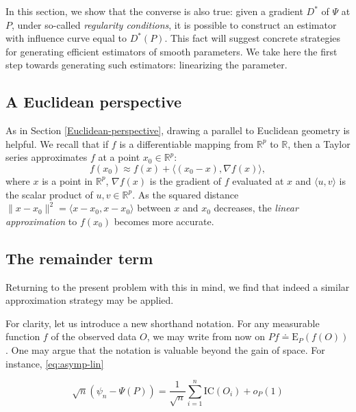 \documentclass[11pt,openright,twoside]{book}
\newcommand{\bbR}{\mathbb{R}}
\newcommand{\defq}{\doteq}
\newcommand{\Exp}{\textrm{E}}
\newcommand{\IC}{\textrm{IC}}
\theoremstyle{definition}
\theoremstyle{definition}
\theoremstyle{definition}
\theoremstyle{remark}
\begin{document}
In this section, we show that the converse is also true: given a gradient
\(D^*\) of \(\Psi\) at \(P\), under so-called \emph{regularity conditions}, it is
possible to construct an estimator with influence curve equal to
\(D^*(P)\). This fact will suggest concrete strategies for generating efficient
estimators of smooth parameters. We take here the first step towards
generating such estimators: linearizing the parameter.

\hypertarget{another-Euclidean-perspective}{%
\subsection{A Euclidean perspective}\label{another-Euclidean-perspective}}

As in Section \ref{Euclidean-perspective}, drawing a parallel to Euclidean
geometry is helpful. We recall that if \(f\) is a differentiable mapping from
\(\bbR^p\) to \(\bbR\), then a Taylor series approximates \(f\) at a point \(x_0 \in \bbR^p\): \begin{equation*} f(x_0)  \approx f(x)  + \langle(x_0  - x),  \nabla
f(x)\rangle,\end{equation*} where \(x\) is a point in \(\bbR^p\), \(\nabla f(x)\) is
the gradient of \(f\) evaluated at \(x\) and \(\langle u,v\rangle\) is the scalar
product of \(u,v \in \bbR^{p}\). As the squared distance \(\|x-x_{0}\|^{2} = \langle x-x_{0}, x-x_{0}\rangle\) between \(x\) and \(x_0\) decreases, the \emph{linear
approximation} to \(f(x_0)\) becomes more accurate.

\hypertarget{the-remainder-term}{%
\subsection{The remainder term}\label{the-remainder-term}}

Returning to the present problem with this in mind, we find that indeed a
similar approximation strategy may be applied.

For clarity, let us introduce a new shorthand notation. For any measurable
function \(f\) of the observed data \(O\), we may write from now on \(P f \defq \Exp_P(f(O))\). One may argue that the notation is valuable beyond the gain of
space. For instance, \eqref{eq:asymp-lin}

\begin{equation*}
\sqrt{n}  (\psi_n  - \Psi(P))  =  \frac{1}{\sqrt{n}}  \sum_{i=1}^n \IC(O_i)  +
o_P(1) 
\end{equation*}
\end{document}
